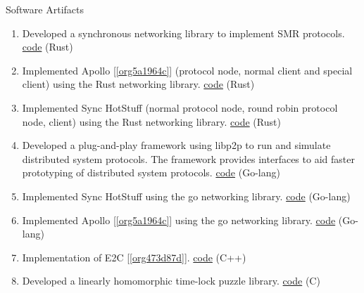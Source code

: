 \documentclass{resume}
\begin{document}
\begin{rSection}{Software Artifacts}
\label{sec:org8a13abb}
\begin{enumerate}
\item Developed a synchronous networking library to implement SMR protocols. \href{https://github.cowwm/adithyabhatkajake/libchatter-rs}{code}  \hfill  (Rust)
\item Implemented Apollo [\ref{org5a1964c}] (protocol node, normal client and special client) using the Rust networking library. \href{https://github.com/adithyabhatkajake/libchatter-rs}{code}  \hfill  (Rust)
\item Implemented Sync HotStuff (normal protocol node, round robin protocol node, client) using the Rust networking library. \href{https://github.com/adithyabhatkajake/libchatter-rs}{code}  \hfill  (Rust)
\item Developed a plug-and-play framework using libp2p to run and simulate distributed system protocols. The framework provides interfaces to aid faster prototyping of distributed system protocols. \href{https://github.com/adithyabhatkajake/libchatter/}{code}  \hfill  (Go-lang)
\item Implemented Sync HotStuff using the go networking library. \href{https://github.com/adithyabhatkajake/libsynchs}{code}  \hfill  (Go-lang)
\item Implemented Apollo [\ref{org5a1964c}] using the go networking library. \href{https://github.com/adithyabhatkajake/libapollo}{code}  \hfill  (Go-lang)
\item Implementation of E2C [\ref{org473d87d}]. \href{https://github.com/adithyabhatkajake/libe2c-cpp}{code}  \hfill  (C++)
\item Developed a linearly homomorphic time-lock puzzle library. \href{https://github.com/verifiable-timed-signatures/liblhtlp}{code}  \hfill  (C)
\end{enumerate}
\end{rSection}
\end{document}
